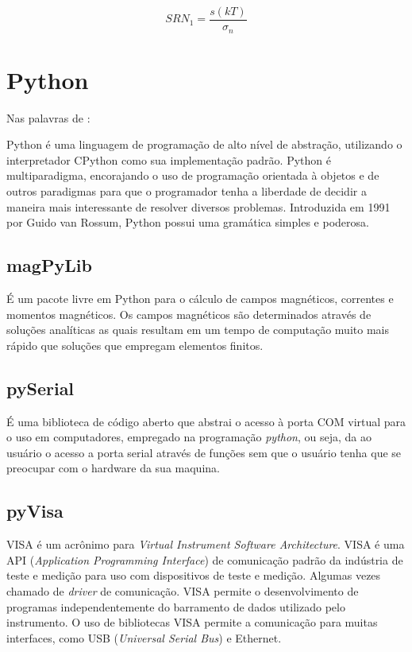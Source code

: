 \begin{equation}
    \label{eq:as}
    SRN_1 = \frac{s(kT)}{\sigma _n}
\end{equation}

\section{Python}
Nas palavras de \cite{bandeira2019}:
\begin{quoting}[rightmargin=0cm,leftmargin=4cm]
{\footnotesize 
Python é uma linguagem de programação de alto nível de abstração, utilizando o interpretador CPython como sua implementação padrão. Python é multiparadigma, encorajando o uso de programação orientada à objetos e de outros paradigmas para que o programador tenha a liberdade de decidir a maneira mais interessante de resolver diversos problemas. Introduzida em 1991 por Guido van Rossum,
Python possui uma gramática simples e poderosa.
}

\end{quoting}

\subsection{magPyLib}

É um pacote livre em Python para o cálculo de campos magnéticos, correntes e momentos magnéticos. Os campos magnéticos são determinados através de soluções analíticas as quais resultam em um tempo de computação muito mais rápido que soluções que empregam elementos finitos. \cite{magpy2020} 

\subsection{pySerial}

É uma biblioteca de código aberto que abstrai o acesso à porta COM virtual para o uso em computadores, empregado na programação \textit{python}, ou seja, da ao usuário o acesso a porta serial através de funções sem que o usuário tenha que se preocupar com o hardware da sua maquina. \cite{pySerial}

\subsection{pyVisa}

VISA é um acrônimo para \textit{Virtual Instrument Software Architecture}. VISA é uma API (\textit{Application Programming Interface}) de comunicação padrão da indústria de teste e medição para uso com dispositivos de teste e medição. Algumas vezes chamado de \textit{driver} de comunicação. VISA permite o desenvolvimento de programas independentemente do barramento de dados utilizado pelo instrumento. O uso de bibliotecas VISA permite a comunicação para muitas interfaces, como USB (\textit{Universal Serial Bus}) e Ethernet.\cite{visaRef}

